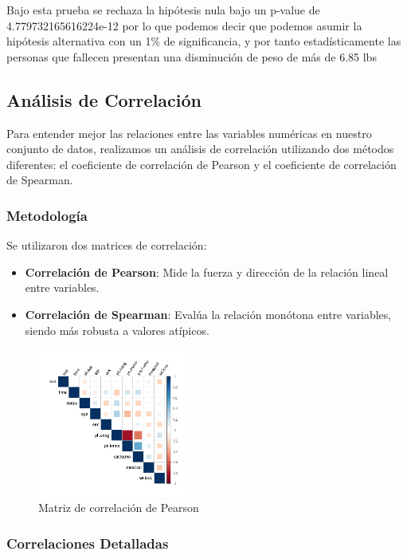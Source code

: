 \documentclass[a4paper,12pt]{article}
\begin{document}
Bajo esta prueba se rechaza la hipótesis nula bajo un p-value de 4.779732165616224e-12 por lo que podemos decir que podemos asumir la hipótesis alternativa con un 1\% de significancia, y por tanto estadísticamente las personas que fallecen presentan una disminución de peso de más de 6.85 lbs
\subsection*{Análisis de Correlación}

Para entender mejor las relaciones entre las variables numéricas en nuestro conjunto de datos, realizamos un análisis de correlación utilizando dos métodos diferentes: el coeficiente de correlación de Pearson y el coeficiente de correlación de Spearman.

\subsubsection*{Metodología}
Se utilizaron dos matrices de correlación:
\begin{itemize}
    \item \textbf{Correlación de Pearson}: Mide la fuerza y dirección de la relación lineal entre variables.
    \item \textbf{Correlación de Spearman}: Evalúa la relación monótona entre variables, siendo más robusta a valores atípicos.
\end{itemize}

\begin{figure}[h]
    \centering
    \includegraphics[width=0.45\textwidth]{correlacion_pearson.png}
    \caption{Matriz de correlación de Pearson}
    \label{fig:correlacion_pearson}
\end{figure}

\newpage
\subsubsection*{Correlaciones Detalladas}
\end{document}

